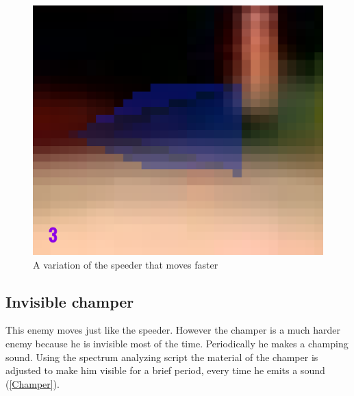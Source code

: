 \begin{figure}[p]
  \centering
  \includegraphics[width=\imgWidth]{images/game_systems/FastSpeeder.png}
  \caption{A variation of the speeder that moves faster}
  \label{FastSpeeder}
\end{figure}


\subsection{Invisible champer}\label{InvisibleChamper}
This enemy moves just like the speeder. However the champer is a much harder enemy because he is invisible most of the time. Periodically he makes a champing sound. Using the spectrum analyzing script the material of the champer is adjusted to make him visible for a brief period, every time he emits a sound (\cref{Champer}).

